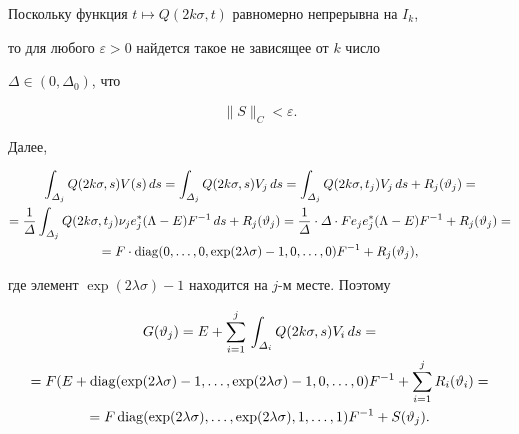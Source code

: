 Поскольку функция $t\mapsto Q(2k\sigma,t)$ равномерно непрерывна на $I_{k}$,


то для любого $\varepsilon>0$ найдется такое не зависящее от $k$ число


$\varDelta\in(0,\varDelta_{0})$, что


\begin{equation}


\|S\|_{C}<\varepsilon.


\end{equation}





Далее,


\begin{multline*}


\int_{\varDelta_j}Q(2k\sigma,s)V(s)\,ds=


\int_{\varDelta_j}Q(2k\sigma,s)V_j\,ds=


\int_{\varDelta_j}Q(2k\sigma,t_j)V_j\,ds+R_j(\vartheta_j)=\\


%


=\frac{1}{\varDelta}\int_{\varDelta_j}Q(2k\sigma,t_j)


\nu_je^*_j(\Lambda-E)F^{-1}\,ds+R_j(\vartheta_j)=


\frac{1}{\varDelta}\cdot\varDelta\cdot Fe_je^*_j(\Lambda-E)F^{-1}+


R_j(\vartheta_j)=\\


%


=F\cdot\diag(0,\dotsc,0,\exp(2\lambda\sigma)-1,0,\dotsc,0)F^{-1}+R_j(\vartheta_j),


\end{multline*}


где элемент $\exp(2\lambda\sigma)-1$ находится на $j$-м месте. Поэтому


\begin{multline*}


G(\vartheta_j)=E+\sum_{i=1}^{j}\,


\int_{\varDelta_{i}}Q(2k\sigma,s)V_i\,ds=\\


%


=F(E+\diag(\exp(2\lambda\sigma)-1,\dotsc,\exp(2\lambda\sigma)-1,


0,\dotsc,0)F^{-1}+\sum_{i=1}^{j}R_i(\vartheta_i)=\\


%


=F\diag(\exp(2\lambda\sigma),\dotsc,\exp(2\lambda\sigma),1,\dotsc,1) F^{-1}+S(\vartheta_{j}).


\end{multline*}


